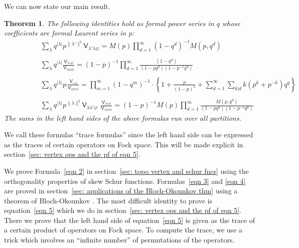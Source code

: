 \documentclass[12pt]{amsart}
\newcommand{\Vsf}{\mathsf{V}}
\newcommand{\bx}{\square}
\renewcommand{\emptyset}{\varnothing}
\newtheorem{theorem}{Theorem}%
\theoremstyle{definition}
\begin{document}
We can now state our main result.

\begin{theorem}\label{thm: main formulas}
The following identities hold as formal power series in $q$ whose
coefficients are formal Laurent series in $p$:
\begin{align}
&\sum_{\lambda} q^{|\lambda |} p^{\| \lambda' \| ^{2}} \Vsf_{\lambda'
\lambda \emptyset }=  M(p) \prod_{d=1}^{\infty} (1-q^{d})^{-1}M(p,q^{d})\label{eqn 2}\\
\quad\nonumber \\
&\sum_{\lambda} q^{|\lambda |}\frac{\Vsf_{\lambda
\bx\emptyset}}{\Vsf_{\lambda \emptyset \emptyset}} =
(1-p)^{-1}\prod_{d=1}^{\infty} \frac{(1-q^{d})}{(1-pq^{d})(1-p^{-1}q^{d})}\label{eqn 3}\\
\quad\nonumber \\
&\sum_{\lambda} q^{|\lambda |} p \, \frac{\Vsf_{\bx \bx 
\lambda}}{\Vsf_{\emptyset \emptyset \lambda}} =
\prod_{m=1}^{\infty}(1-q^{m})^{-1}\cdot \left\{
1+\frac{p}{(1-p)^{2}}+\sum_{d=1}^{\infty}\sum_{k|d}k(p^{k}+p^{-k})q^{q}\right\}\label{eqn 4}\\
\quad&\quad \nonumber \\
\quad \quad \quad \quad &\sum_{\lambda} q^{|\lambda |} p^{\| \lambda \| ^{2}}
\Vsf_{\lambda \lambda' \emptyset} \,\,\frac{\Vsf_{\lambda \bx \emptyset}}{\Vsf_{\lambda \emptyset
\emptyset}} =
(1-p)^{-1}M(p)\prod_{d=1}^{\infty}
\frac{M(p,q^{d})}{(1-pq^{d})(1-p^{-1}q^{d})}\label{eqn 5}
\end{align}
The sums in the left hand sides of the above formulas run over all
partitions. 
\end{theorem}




We call these formulas ``trace formulas'' since the left hand side can
be expressed as the traces of certain operators on Fock space. This
will be made explicit in section~\ref{sec: vertex ops and the pf of
eqn 5}.

We prove Formula~\eqref{eqn 2} in section~\ref{sec: topo vertex and
schur fncs} using the orthogonality properties of skew Schur
functions. Formulas~\eqref{eqn 3} and \eqref{eqn 4} are proved in
section~\ref{sec: applications of the Bloch-Okounkov thm} using a
theorem of Bloch-Okounkov \cite{Bloch-Okounkov}. The most difficult
identity to prove is equation~\eqref{eqn 5} which we do in
section~\ref{sec: vertex ops and the pf of eqn 5}. There we prove that
the left hand side of equation~\eqref{eqn 5} is given as the trace of
a certain product of operators on Fock space. To compute the trace, we
use a trick which involves an ``infinite number'' of permutations of
the operators.
\end{document}
